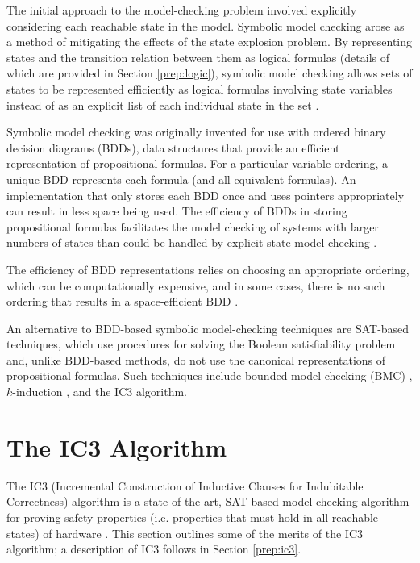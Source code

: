 \documentclass[12pt,a4paper,twoside,openright]{report}
\begin{document}
The initial approach to the model-checking problem involved explicitly
considering each reachable state in the model.
Symbolic model checking arose as a method of mitigating the effects of
the state explosion problem. By representing
states and the transition relation between them as logical formulas
(details of which are provided in Section \ref{prep:logic}),
symbolic model checking allows sets of states to be
represented efficiently as logical formulas involving state variables
instead of as an explicit list of each individual state in the set
\cite{mcmillan92}. 

Symbolic model checking was originally invented for use with ordered
binary decision diagrams (BDDs), data structures that provide an efficient
representation of propositional formulas. For a particular variable
ordering, a unique BDD represents each formula (and all equivalent formulas).
An implementation that only stores each BDD once and uses pointers appropriately
can result in less space being used.
The efficiency of BDDs in storing propositional formulas facilitates the model
checking of systems with larger numbers of states than could be handled
by explicit-state model checking \cite{mcmillan92}.

The efficiency of BDD representations relies on choosing an appropriate
ordering, which can be computationally expensive, and in some cases,
there is no such ordering that results in a space-efficient BDD
\cite{biere99a}.

An alternative to BDD-based symbolic model-checking techniques are SAT-based
techniques, which use procedures for solving the Boolean satisfiability
problem and, unlike BDD-based methods, do not use the canonical representations
of propositional formulas.
Such techniques include bounded model checking (BMC)
\cite{biere99a}, $k$-induction \cite{sheeran00},
and the IC3 algorithm.


\section{The IC3 Algorithm}


The IC3 (Incremental Construction of Inductive Clauses for Indubitable Correctness)
algorithm is a state-of-the-art,
SAT-based model-checking
algorithm for proving safety properties (i.e. properties that must hold
in all reachable states) of hardware \cite{bradley11}. This section outlines some of the
merits of the IC3 algorithm; a description of IC3 follows in Section
\ref{prep:ic3}.
\end{document}
